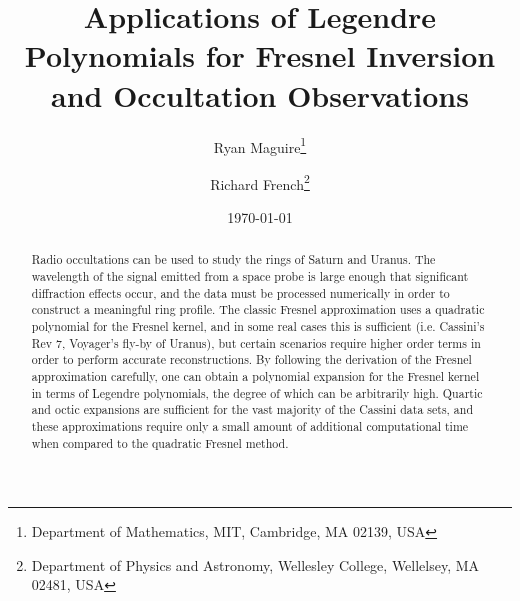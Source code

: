 \documentclass{article}
\title{%
    Applications of Legendre Polynomials for
    Fresnel Inversion and Occultation Observations%
}
\author{%
    Ryan Maguire\footnote{%
        Department of Mathematics,
        MIT, Cambridge, MA 02139, USA
    }
    \and
    Richard French\footnote{
        Department of Physics and Astronomy,
        Wellesley College, Wellelsey, MA 02481, USA
    }
}
\date{\today}
\theoremstyle{plain}
\begin{document}
    \maketitle
    \begin{abstract}
        Radio occultations can be used to study the rings of Saturn and
        Uranus. The wavelength of the signal emitted from a space probe is
        large enough that significant diffraction effects occur,
        and the data must be processed numerically in order to construct a
        meaningful ring profile. The classic Fresnel approximation uses a
        quadratic polynomial for the Fresnel kernel, and in some real cases
        this is sufficient (i.e. Cassini's Rev 7, Voyager's fly-by of Uranus),
        but certain scenarios require higher order terms in order to perform
        accurate reconstructions. By following the derivation of the
        Fresnel approximation carefully, one can obtain a polynomial expansion
        for the Fresnel kernel in terms of Legendre polynomials, the degree
        of which can be arbitrarily high. Quartic and octic
        expansions are sufficient for the vast majority of the Cassini data
        sets, and these approximations require only a small amount of
        additional computational time when compared to the quadratic Fresnel
        method.
    \end{abstract}
    \tableofcontents
\end{document}
